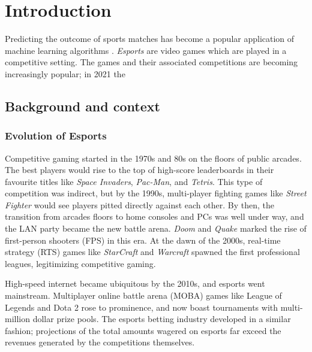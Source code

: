\chapter{Introduction}
\label{Introduction}

\newcommand{\keyword}[1]{\textbf{#1}}
\newcommand{\tabhead}[1]{\textbf{#1}}
\newcommand{\code}[1]{\texttt{#1}}
\newcommand{\file}[1]{\texttt{\bfseries#1}}
\newcommand{\option}[1]{\texttt{\itshape#1}}

Predicting the outcome of sports matches has become a popular application of machine learning algorithms \cite{mlsports}. \textit{Esports} are video games which are played in a competitive setting. The games and their associated competitions are becoming increasingly popular; in 2021 the   

\section{Background and context}

\subsection{Evolution of Esports}

Competitive gaming started in the 1970s and 80s on the floors of public arcades. The best players would rise to the top of  high-score leaderboards in their favourite titles like \textit{Space Invaders}, \textit{Pac-Man}, and \textit{Tetris}. This type of competition was indirect, but by the 1990s, multi-player fighting games like \textit{Street Fighter} would see players pitted directly against each other. By then, the transition from arcades floors to home consoles and PCs was well under way, and the LAN party became the new battle arena. \textit{Doom} and \textit{Quake} marked the rise of first-person shooters (FPS) in this era. At the dawn of the 2000s, real-time strategy (RTS) games like \textit{StarCraft} and \textit{Warcraft} spawned the first professional leagues, legitimizing competitive gaming.

High-speed internet became ubiquitous by the 2010s, and esports went mainstream. Multiplayer online battle arena (MOBA) games like League of Legends and Dota 2 rose to prominence, and now boast tournaments with multi-million dollar prize pools. The esports betting industry developed in a similar fashion; projections of the total amounts wagered on esports far exceed the revenues generated by the competitions themselves. 

